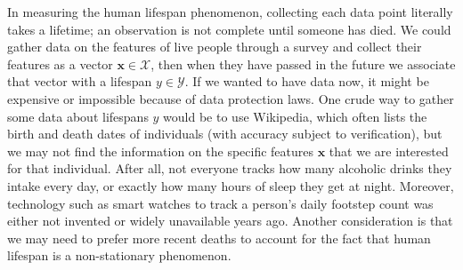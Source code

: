 \documentclass[12pt]{article}
\providecommand{\DIFaddbegin}{} %
\begin{document}
	In measuring the human lifespan phenomenon, collecting each data point
	literally takes a lifetime; an observation is not complete until someone has
	died. We could gather data on the features of live people through a survey
	and collect their features as a vector $\bm{x}\in \mathcal{X}$, then when
	they have passed in the future we associate that vector with a lifespan
	$y\in\mathcal{Y}$. If we wanted to have data now, it might be expensive or
	impossible because of data protection laws. One crude way to gather some
	data about lifespans $y$ would be to use Wikipedia, which often lists the birth and
	death dates of individuals (with accuracy subject to verification), but
	we may not find the information on the specific features $\bm{x}$ that we
	are interested for that individual. After all, not everyone tracks how many
	alcoholic drinks they intake every day, or exactly how many hours of sleep they
	get at night. Moreover, technology such as smart watches to track a person's daily
	footstep count was either not invented or widely unavailable years ago.
	Another consideration is that we may need to prefer more recent deaths to
	account for the fact that human lifespan is a non-stationary phenomenon.
	\DIFaddbegin 
\end{document}
